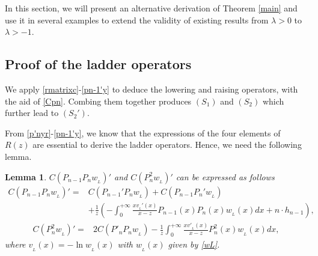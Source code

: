 \documentclass[12pt,a4paper]{article}    %
\newtheorem{lemma}[theorem]{Lemma}
\numberwithin{equation}{section}
\begin{document}
In this section, we will present an alternative derivation of Theorem \ref{main} and use it in several examples to extend the validity of  existing results from $\lambda>0$ to $\lambda>-1$.
	
\subsection{Proof of the ladder operators}
We apply \eqref{rmatrixc}-\eqref{pn-1'y} to deduce the lowering and raising operators, with the aid of \eqref{Cpn}. Combing them together produces $(S_1)$ and $(S_2)$ which further lead to $(S_2')$.

From \eqref{p'nyr}-\eqref{pn-1'y}, we know that the expressions of the four elements of $R(z)$ are essential to derive the ladder operators. Hence, we need the following lemma.
\begin{lemma}\label{lemmal}
$C(P_{n-1}P_nw_{_L})'$  and  $ C(P_{n}^{2}w_{_L})'$ can be expressed as follows
\begin{equation}\label{lemma21}	
\begin{aligned}		 C(P_{n-1}P_{n}w_{_L})'=&C(P_{n-1}'P_nw_{_L})+C(P_{n-1}P_n'w_{_L})\\			 &+\frac{1}{z}\left(-\int_{0}^{+\infty}\frac{xv_{_L}'(x)}{x-z}P_{n-1}(x)P_{n}(x)w_{_L}(x)dx+n\cdot h_{n-1}\right),
\end{aligned}
\end{equation}
 \begin{align}\label{CPn2'}
C(P_{n}^{2}w_{_L})'	 =&2C(P'_nP_nw_{_L})-\frac{1}{z}\int_{0}^{+\infty}\frac{xv'_{_L}(x)}{x-z}P_n^{2}(x)w_{_L}(x)dx,
\end{align}
where $v_{_L}(x)=-\ln w_{_L}(x)$ with $w_{_L}(x)$ given by \eqref{wL}.
\end{lemma}	
\end{document}
